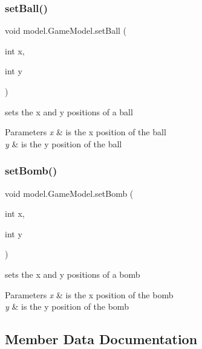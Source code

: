 \subsubsection{\texorpdfstring{set\+Ball()}{setBall()}}
{\footnotesize\ttfamily void model.\+Game\+Model.\+set\+Ball (\begin{DoxyParamCaption}\item[{int}]{x,  }\item[{int}]{y }\end{DoxyParamCaption})}



sets the x and y positions of a ball 


\begin{DoxyParams}{Parameters}
{\em x} & is the x position of the ball \\
\hline
{\em y} & is the y position of the ball \\
\hline
\end{DoxyParams}
\hypertarget{classmodel_1_1_game_model_af426dea55d8fff1227dea8bb74530611}{}\label{classmodel_1_1_game_model_af426dea55d8fff1227dea8bb74530611} 
\subsubsection{\texorpdfstring{set\+Bomb()}{setBomb()}}
{\footnotesize\ttfamily void model.\+Game\+Model.\+set\+Bomb (\begin{DoxyParamCaption}\item[{int}]{x,  }\item[{int}]{y }\end{DoxyParamCaption})}



sets the x and y positions of a bomb 


\begin{DoxyParams}{Parameters}
{\em x} & is the x position of the bomb \\
\hline
{\em y} & is the y position of the bomb \\
\hline
\end{DoxyParams}


\subsection{Member Data Documentation}
\hypertarget{classmodel_1_1_game_model_a1b56c649031a3fb9c0b2930edf719de3}{}\label{classmodel_1_1_game_model_a1b56c649031a3fb9c0b2930edf719de3} 
